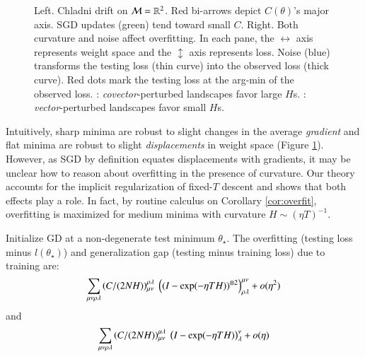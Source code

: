             \begin{figure}%
                \centering
                \crunch\squash
                \caption{%
                    Left.  Chladni drift on $\mathcal{M}=\mathbb{R}^2$.  Red bi-arrows depict
                    $C(\theta)$'s major axis.  SGD updates (green) tend toward
                    small $C$.
                    Right.
                    Both curvature and noise affect overfitting.
                    In each pane, the  $\leftrightarrow$
                    axis represents weight space and the $\updownarrow$
                    axis represents loss.  Noise (blue) transforms
                    the testing loss (thin curve) into the observed loss
                    (thick curve).  Red dots mark the testing loss at the
                    arg-min of the observed loss.  \protect{}:
                    \emph{covector}-perturbed landscapes favor large $H$s.
                    \protect{}: \emph{vector}-perturbed landscapes
                    favor small $H$s.  %
                }
                \label{fig:spring}
            \end{figure}
            Intuitively, sharp minima are robust to slight changes in the
            average \emph{gradient} and flat minima are robust to slight
            \emph{displacements} in weight space (Figure
            \ref{fig:spring}\protect{}).  However, as SGD by
            definition equates displacements with gradients, it may be unclear
            how to reason about overfitting in the presence of curvature.
            Our theory accounts for the implicit
            regularization of fixed-$T$ descent and shows that both effects play
            a role.  In fact, by routine calculus on 
            Corollary \ref{cor:overfit}, overfitting is maximized for medium
            minima with curvature $H \sim (\eta T)^{-1}$.
            \begin{cor}\label{cor:overfit}
                Initialize GD at a non-degenerate test minimum $\theta_\star$.
                The overfitting (testing loss minus $l(\theta_\star)$) and generalization
                gap (testing minus training loss) due to training are:
                $$
                    \sum_{\mu\nu\rho\lambda}
                    \left(C/(2NH)\right)_{\mu\nu}^{\rho\lambda} ~
                        \left((I - \exp(-\eta T H))^{\otimes 2}\right)^{\mu\nu}_{\rho\lambda}
                        + o(\eta^2)
                $$
                and
                $$
                    \sum_{\mu\nu\rho\lambda}
                    \left(C/(2NH)\right)_{\mu\nu}^{\mu\lambda} ~
                        \left(I - \exp(-\eta T H)\right)^{\nu}_{\lambda}
                        + o(\eta)
                $$
            \end{cor}
